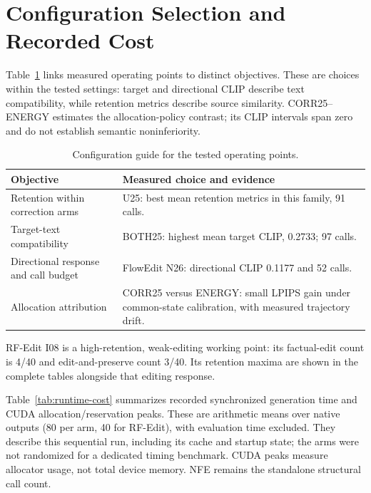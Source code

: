 \section{Configuration Selection and Recorded Cost}
Table~\ref{tab:configuration-guide} links measured operating points to distinct objectives. These are choices within the tested settings: target and directional CLIP describe text compatibility, while retention metrics describe source similarity. CORR25--ENERGY estimates the allocation-policy contrast; its CLIP intervals span zero and do not establish semantic noninferiority.
\begin{table}[t]
\centering\small
\caption{Configuration guide for the tested operating points.}
\label{tab:configuration-guide}
\begin{tabular}{>{\raggedright\arraybackslash}p{}>{\raggedright\arraybackslash}p{}}
\toprule
Objective & Measured choice and evidence\\
\midrule
Retention within correction arms & U25: best mean retention metrics in this family, 91 calls.\\
Target-text compatibility & BOTH25: highest mean target CLIP, 0.2733; 97 calls.\\
Directional response and call budget & FlowEdit N26: directional CLIP 0.1177 and 52 calls.\\
Allocation attribution & CORR25 versus ENERGY: small LPIPS gain under common-state calibration, with measured trajectory drift.\\
\bottomrule
\end{tabular}
\end{table}

RF-Edit I08 is a high-retention, weak-editing working point: its factual-edit count is 4/40 and edit-and-preserve count 3/40. Its retention maxima are shown in the complete tables alongside that editing response.

Table~\ref{tab:runtime-cost} summarizes recorded synchronized generation time and CUDA allocation/reservation peaks. These are arithmetic means over native outputs (80 per arm, 40 for RF-Edit), with evaluation time excluded. They describe this sequential run, including its cache and startup state; the arms were not randomized for a dedicated timing benchmark. CUDA peaks measure allocator usage, not total device memory. NFE remains the standalone structural call count.


